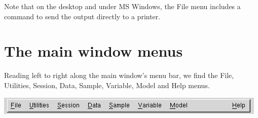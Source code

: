  Note that on the  desktop and under MS Windows, the
 \textsf{File} menu includes a command to send the output directly to
 a printer.


\section{The main window menus}
\label{menus}


      Reading left to right along the main window's menu bar, we find
      the File, Utilities, Session, Data, Sample, Variable, Model and
      Help menus.
    \begin{center}
      \includegraphics[scale=0.5]{figures/menubar}
    \end{center}

